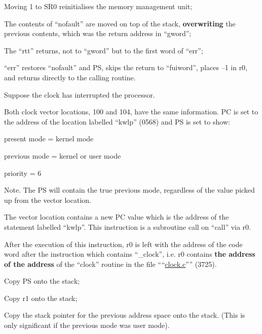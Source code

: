 \item[0765:] Moving 1 to SR0 reinitialises the
 memory management unit;

\item[0766:] The contents of ``nofault'' are
 moved on top of the stack,
 {\bf overwriting} the previous contents, which was the return
 address in ``gword'';

\item[0767:] The ``rtt'' returns, not to ``gword''
 but to the first word of ``err'';

\item[0880:] ``err'' restores ``nofault'' and PS,
 skips the return to ``fuiword'',
 places --1 in r0, and returns
 directly to the calling routine.
\ed


Suppose the clock has interrupted the
processor.


Both clock vector locations, 100 and
104, have the same information. PC is
set to the address of the location
labelled ``kwlp'' (0568) and PS is set to
show:

 present mode = kernel mode

 previous mode = kernel or user mode

 priority = 6


\noindent Note.
The PS will contain the true previous mode, regardless of the value
picked up from the vector location.

\bd
\item[0570:] The vector location contains a
 new PC value which is the address
 of the statement labelled ``kwlp''.
 This instruction is a subroutine
 call on ``call'' via r0.

 After the execution of this
 instruction, r0 is left with the
 address of the code word after
 the instruction which contains
 ``\_clock'', i.e. r0 contains {\bf the
 address of the address} of the
 ``clock'' routine in the file
 ````\href{./v6/ken/clock.c}{clock.c}'''' (3725).
\ed


\bd
\item[0777:] Copy PS onto the stack;

\item[0779:] Copy r1 onto the stack;

\item[0780:] Copy the stack pointer for the
 previous address space onto the
 stack. (This is only significant
 if the previous mode was user
 mode).


